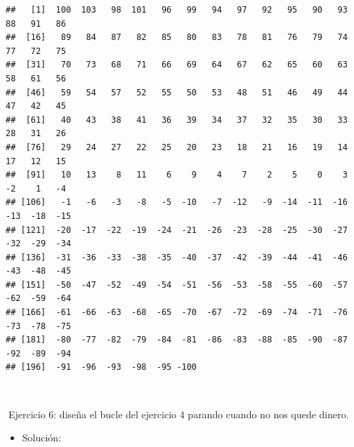 \documentclass[11pt,]{book}
\newenvironment{Shaded}{\begin{snugshade}}{\end{snugshade}}
\newcommand{\CommentTok}[1]{\textcolor[rgb]{0.37,0.37,0.37}{\textit{#1}}}
\newcommand{\ControlFlowTok}[1]{\textcolor[rgb]{0.27,0.27,0.27}{\textbf{#1}}}
\newcommand{\DecValTok}[1]{\textcolor[rgb]{0.06,0.06,0.06}{#1}}
\newcommand{\KeywordTok}[1]{\textcolor[rgb]{0.27,0.27,0.27}{\textbf{#1}}}
\newcommand{\NormalTok}[1]{#1}
\newcommand{\OperatorTok}[1]{\textcolor[rgb]{0.43,0.43,0.43}{\textbf{#1}}}
\newcommand{\StringTok}[1]{\textcolor[rgb]{0.5,0.5,0.5}{#1}}
\providecommand{\tightlist}{%
  \setlength{\itemsep}{0pt}\setlength{\parskip}{0pt}}
\begin{document}
\begin{verbatim}
##   [1]  100  103   98  101   96   99   94   97   92   95   90   93   88   91   86
##  [16]   89   84   87   82   85   80   83   78   81   76   79   74   77   72   75
##  [31]   70   73   68   71   66   69   64   67   62   65   60   63   58   61   56
##  [46]   59   54   57   52   55   50   53   48   51   46   49   44   47   42   45
##  [61]   40   43   38   41   36   39   34   37   32   35   30   33   28   31   26
##  [76]   29   24   27   22   25   20   23   18   21   16   19   14   17   12   15
##  [91]   10   13    8   11    6    9    4    7    2    5    0    3   -2    1   -4
## [106]   -1   -6   -3   -8   -5  -10   -7  -12   -9  -14  -11  -16  -13  -18  -15
## [121]  -20  -17  -22  -19  -24  -21  -26  -23  -28  -25  -30  -27  -32  -29  -34
## [136]  -31  -36  -33  -38  -35  -40  -37  -42  -39  -44  -41  -46  -43  -48  -45
## [151]  -50  -47  -52  -49  -54  -51  -56  -53  -58  -55  -60  -57  -62  -59  -64
## [166]  -61  -66  -63  -68  -65  -70  -67  -72  -69  -74  -71  -76  -73  -78  -75
## [181]  -80  -77  -82  -79  -84  -81  -86  -83  -88  -85  -90  -87  -92  -89  -94
## [196]  -91  -96  -93  -98  -95 -100
\end{verbatim}

~

📝Ejercicio 6: diseña el bucle del ejercicio 4 parando cuando no nos quede dinero.

\begin{itemize}
\tightlist
\item
  Solución:
\end{itemize}

\begin{Shaded}
\end{Shaded}
\end{document}
